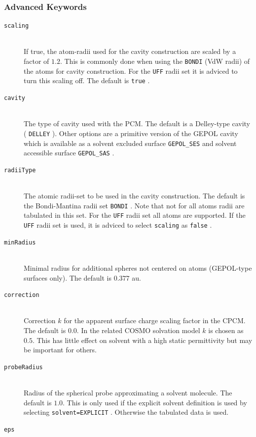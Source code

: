 \documentclass[bibliography=totocnumbered,a4paper,10pt,oneside]{scrbook}
\newcommand{\ttt}[1]{%
  \begingroup\setlength{\fboxsep}{1pt}%
  \colorbox{serenity-green!30}{\texttt{\hspace*{2pt}\vphantom{(g}#1\hspace*{2pt}}}%
  \endgroup
}
\begin{document}
\subsubsection{Advanced Keywords}
\begin{description}
    \item [\texttt{scaling}]\hfill \\
    If true, the atom-radii used for the cavity construction are scaled by a factor of $1.2$. This is commonly done 
    when using the \texttt{BONDI} (VdW radii) of the atoms for cavity construction. For the \ttt{UFF} radii set it is 
    adviced to turn this scaling off. The default is \ttt{true}.
    \item [\texttt{cavity}]\hfill \\
    The type of cavity used with the PCM. The default is a Delley-type cavity (\ttt{DELLEY}). Other options are 
    a primitive version of the GEPOL cavity which is available as a solvent excluded surface \ttt{GEPOL\_SES} and 
    solvent accessible surface \ttt{GEPOL\_SAS}.
    \item [\texttt{radiiType}]\hfill \\
    The atomic radii-set to be used in the cavity construction. The default is the Bondi-Mantina radii set \ttt{BONDI}.
    Note that not for all atoms radii are tabulated in this set. For the \ttt{UFF} radii set all atoms are supported.
    If the \texttt{UFF} radii set is used, it is adviced to select \ttt{scaling} as \ttt{false}.   
    \item [\texttt{minRadius}]\hfill \\
    Minimal radius for additional spheres not centered on atoms (GEPOL-type surfaces only). The default is $0.377$ au.
    \item [\texttt{correction}]\hfill \\
    Correction $k$ for the apparent surface charge scaling factor in the CPCM. The default is $0.0$. In the related 
    COSMO solvation model $k$ is chosen as $0.5$. This has little effect on solvent with a high static permittivity
    but may be important for others.
    \item [\texttt{probeRadius}]\hfill \\
    Radius of the spherical probe approximating a solvent molecule. The default is $1.0$. This is only used if 
    the explicit solvent definition is used by selecting \ttt{solvent=EXPLICIT}. Otherwise the tabulated
    data is used.
    \item [\texttt{eps}]\hfill \\

\end{description}
\end{document}
